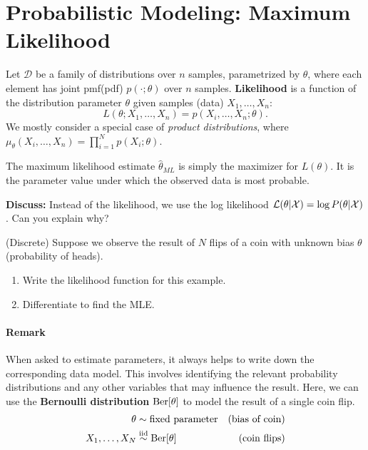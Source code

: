 \documentclass{discussion}
\begin{document}
\section{Probabilistic Modeling: Maximum Likelihood}

Let $\mathcal{D}$ be a family of distributions over $n$ samples, parametrized by $\theta$, where each element has joint pmf(pdf) $p(\cdot;\theta)$ over $n$ samples. \textbf{Likelihood} is a function of the distribution parameter $\theta$ given samples (data) $X_1, \ldots, X_n$:
\[L(\theta; X_1, \ldots, X_n) = p(X_i, \ldots, X_n; \theta).\]
We mostly consider a special case of \emph{product distributions}, where $\mu_\theta(X_i, \ldots, X_n) = \prod_{i=1}^{N} p(X_i;\theta).$

The maximum likelihood estimate $\hat{\theta}_{ML}$ is simply the maximizer for $L(\theta)$. It is the parameter value under which the observed data is most probable.




\textbf{Discuss:} Instead of the likelihood, we use the log likelihood $\mathcal{L}(\theta|\mathcal{X}) = \log P(\theta|\mathcal{X})$. Can you explain why?

\vspace{1em}

\begin{exercise}(Discrete)
Suppose we observe the result of $N$ flips of a coin with unknown bias $\theta$ (probability of heads).
\begin{enumerate}
\item Write the likelihood function for this example.
\item Differentiate to find the MLE. 
\end{enumerate}
\end{exercise}

\paragraph{Remark}When asked to estimate parameters, it always helps to write down the corresponding data model.  This involves identifying the relevant probability distributions and any other variables that may influence the result.  Here, we can use the \textbf{Bernoulli distribution} $\text{Ber}[\theta]$ to model the result of a single coin flip.
    \begin{align*}
    \theta &\sim \text{fixed parameter} & \text{(bias of coin)} \\
    X_1, \dots, X_N &\stackrel{\text{iid}}{\sim} \text{Ber}[\theta] & \text{(coin flips)}
    \end{align*}
\end{document}

